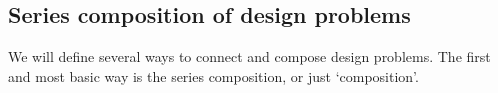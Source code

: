 %
%
%


\subsection{Series composition of design problems}

We will define several ways to connect and compose design problems. The first and most basic way is the series composition, or just `composition'.

